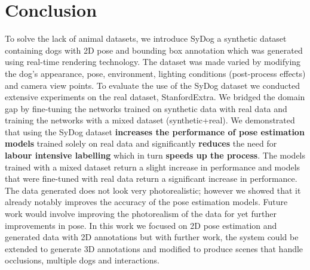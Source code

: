 \documentclass[final]{cvpr}
\begin{document}
\section{Conclusion}
To solve the lack of animal datasets, we introduce SyDog a synthetic dataset containing dogs with 2D pose and bounding box annotation which was generated using real-time rendering technology. The dataset was made varied by modifying the dog's appearance, pose, environment, lighting conditions (post-process effects) and camera view points. To evaluate the use of the SyDog dataset we conducted extensive experiments on the real dataset, StanfordExtra. We bridged the domain gap by fine-tuning the networks trained on synthetic data with real data and training the networks with a mixed dataset (synthetic+real). We demonstrated that using the SyDog dataset \textbf{increases the performance of pose estimation models} trained solely on real data and significantly \textbf{reduces} the need for \textbf{labour intensive labelling} which in turn \textbf{speeds up the process}. The models trained with a mixed dataset return a slight increase in performance and models that were fine-tuned with real data return a significant increase in performance. The data generated does not look very photorealistic; however we showed that it already notably improves the accuracy of the pose estimation models. Future work would involve improving the photorealism of the data for yet further improvements in pose. In this work we focused on 2D pose estimation and generated data with 2D annotations but with further work, the system could be extended to generate 3D annotations and modified to produce scenes that handle occlusions, multiple dogs and interactions.

{\small


}
\end{document}
